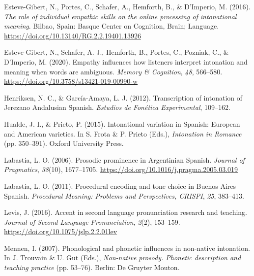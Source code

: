 \documentclass[]{article}
\newlength{\cslhangindent}
\newenvironment{CSLReferences}[2] %
 {%
  \setlength{\parindent}{0pt}
  \ifodd #1 \everypar{\setlength{\hangindent}{\cslhangindent}}\ignorespaces\fi
  \ifnum #2 > 0
  \setlength{\parskip}{#2\baselineskip}
  \fi
 }%
 {}
\begin{document}
\begin{CSLReferences}{1}{0}
\leavevmode{}%
Esteve-Gibert, N., Portes, C., Schafer, A., Hemforth, B., \& D'Imperio, M. (2016). \emph{The role of individual empathic skills on the online processing of intonational meaning}. Bilbao, Spain: Basque Center on Cognition, Brain; Language. \url{https://doi.org/10.13140/RG.2.2.19401.13926}

\leavevmode{}%
Esteve-Gibert, N., Schafer, A. J., Hemforth, B., Portes, C., Pozniak, C., \& D'Imperio, M. (2020). Empathy influences how listeners interpret intonation and meaning when words are ambiguous. \emph{Memory \& Cognition}, \emph{48}, 566--580. \url{https://doi.org/10.3758/s13421-019-00990-w}

\leavevmode{}%
Henriksen, N. C., \& García-Amaya, L. J. (2012). Transcription of intonation of {J}erezano {A}ndalusian {S}panish. \emph{Estudios de {F}onética {E}xperimental}, 109--162.

\leavevmode{}%
Hualde, J. I., \& Prieto, P. (2015). Intonational variation in {S}panish: {E}uropean and {A}merican varieties. In S. Frota \& P. Prieto (Eds.), \emph{Intonation in {R}omance} (pp. 350--391). Oxford University Press.

\leavevmode{}%
Labastía, L. O. (2006). Prosodic prominence in {A}rgentinian {S}panish. \emph{Journal of Pragmatics}, \emph{38}(10), 1677--1705. \url{https://doi.org/10.1016/j.pragma.2005.03.019}

\leavevmode{}%
Labastía, L. O. (2011). Procedural encoding and tone choice in {Buenos Aires Spanish}. \emph{Procedural Meaning: Problems and Perspectives, CRISPI}, \emph{25}, 383--413.

\leavevmode{}%
Levis, J. (2016). Accent in second language pronunciation research and teaching. \emph{Journal of Second Language Pronunciation}, \emph{2}(2), 153--159. \url{https://doi.org/10.1075/jslp.2.2.01lev}

\leavevmode{}%
Mennen, I. (2007). Phonological and phonetic influences in non-native intonation. In J. Trouvain \& U. Gut (Eds.), \emph{Non-native prosody. Phonetic description and teaching practice} (pp. 53--76). Berlin: De Gruyter Mouton.


\end{CSLReferences}
\end{document}
